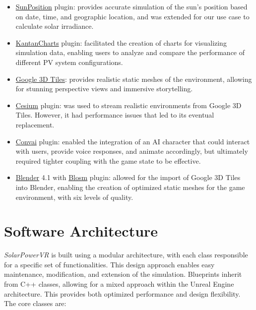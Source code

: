 \documentclass[draft, final]{vutinfth} %
\begin{document}
\begin{itemize}
    \item \href{https://dev.epicgames.com/documentation/en-us/unreal-engine/geographically-accurate-sun-positioning-tool-in-unreal-engine?application_version=5.4}{SunPosition} plugin: provides accurate simulation of the sun's position based on date, time, and geographic location, and was extended for our use case to calculate solar irradiance.
    \item \href{https://github.com/kamrann/KantanCharts}{KantanCharts} plugin: facilitated the creation of charts for visualizing simulation data, enabling users to analyze and compare the performance of different PV system configurations.
    \item \href{https://developers.google.com/maps/documentation/tile/3d-tiles-overview}{Google 3D Tiles}: provides realistic static meshes of the environment, allowing for stunning perspective views and immersive storytelling.
    \item \href{https://cesium.com/platform/cesium-for-unreal/}{Cesium} plugin: was used to stream realistic environments from Google 3D Tiles. However, it had performance issues that led to its eventual replacement.
    \item \href{https://www.unrealengine.com/marketplace/en-US/product/convai}{Convai} plugin: enabled the integration of an AI character that could interact with users, provide voice responses, and animate accordingly, but ultimately required tighter coupling with the game state to be effective.
    \item \href{https://www.blender.org/}{Blender} 4.1 with \href{https://prochitecture.gumroad.com/l/blender-osm}{Blosm} plugin: allowed for the import of Google 3D Tiles into Blender, enabling the creation of optimized static meshes for the game environment, with six levels of quality.
\end{itemize}

\section{Software Architecture}

\textit{SolarPowerVR} is built using a modular architecture, with each class responsible for a specific set of functionalities. This design approach enables easy maintenance, modification, and extension of the simulation. Blueprints inherit from C++ classes, allowing for a mixed approach within the Unreal Engine architecture. This provides both optimized performance and design flexibility. The core classes are:
\end{document}
